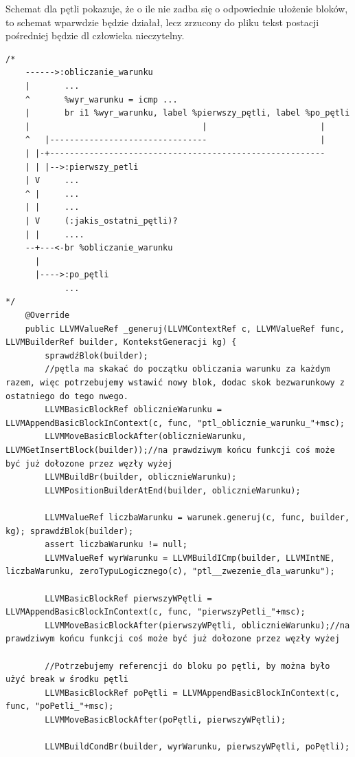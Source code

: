 Schemat dla pętli pokazuje, że o ile nie zadba się o odpowiednie ułożenie bloków, to schemat wparwdzie będzie działał, lecz zrzucony do pliku tekst postacji pośredniej będzie dl człowieka nieczytelny.
\lstset{
    escapechar=`,
    breaklines=true
}
\begin{lstlisting}[basicstyle=\scriptsize]
/*
    ------>:obliczanie_warunku
    |       ...
    ^       %wyr_warunku = icmp ...
    |       br i1 %wyr_warunku, label %pierwszy_pętli, label %po_pętli
    |                                   |                       |
    ^   |--------------------------------                       |
    | |-+--------------------------------------------------------
    | | |-->:pierwszy_petli
    | V     ...
    ^ |     ...
    | |     ...
    | V     (:jakis_ostatni_pętli)?
    | |     ....
    --+---<-br %obliczanie_warunku
      |
      |---->:po_pętli
            ...
*/
    @Override
    public LLVMValueRef _generuj(LLVMContextRef c, LLVMValueRef func, LLVMBuilderRef builder, KontekstGeneracji kg) {
        sprawdźBlok(builder);
        //pętla ma skakać do początku obliczania warunku za każdym razem, więc potrzebujemy wstawić nowy blok, dodac skok bezwarunkowy z ostatniego do tego nwego.
        LLVMBasicBlockRef oblicznieWarunku = LLVMAppendBasicBlockInContext(c, func, "ptl_oblicznie_warunku_"+msc);
        LLVMMoveBasicBlockAfter(oblicznieWarunku, LLVMGetInsertBlock(builder));//na prawdziwym końcu funkcji coś może być już dołozone przez węzły wyżej
        LLVMBuildBr(builder, oblicznieWarunku);
        LLVMPositionBuilderAtEnd(builder, oblicznieWarunku);

        LLVMValueRef liczbaWarunku = warunek.generuj(c, func, builder, kg); sprawdźBlok(builder);
        assert liczbaWarunku != null;
        LLVMValueRef wyrWarunku = LLVMBuildICmp(builder, LLVMIntNE, liczbaWarunku, zeroTypuLogicznego(c), "ptl__zwezenie_dla_warunku");

        LLVMBasicBlockRef pierwszyWPętli = LLVMAppendBasicBlockInContext(c, func, "pierwszyPetli_"+msc);
        LLVMMoveBasicBlockAfter(pierwszyWPętli, oblicznieWarunku);//na prawdziwym końcu funkcji coś może być już dołozone przez węzły wyżej

        //Potrzebujemy referencji do bloku po pętli, by można było użyć break w środku pętli
        LLVMBasicBlockRef poPętli = LLVMAppendBasicBlockInContext(c, func, "poPetli_"+msc);
        LLVMMoveBasicBlockAfter(poPętli, pierwszyWPętli);

        LLVMBuildCondBr(builder, wyrWarunku, pierwszyWPętli, poPętli);


\end{lstlisting}
